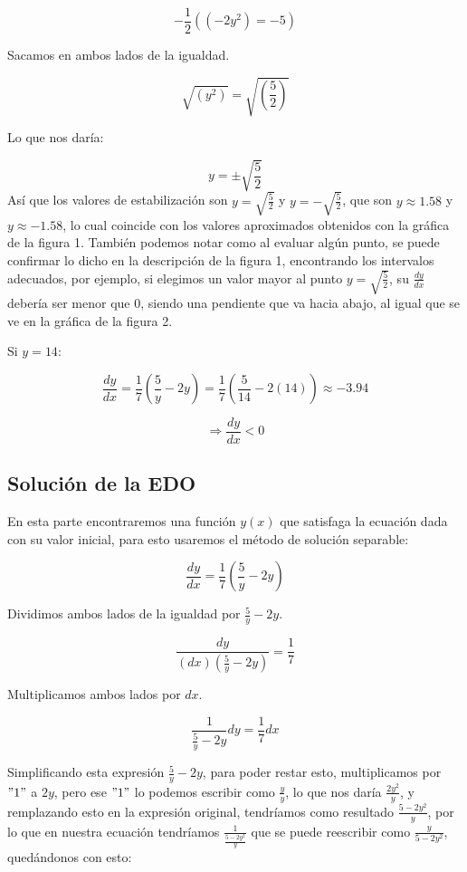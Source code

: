 \documentclass{article}
\begin{document}
\[
 -\frac{1}{2}\left((- 2y^2)  = -5\right)
\]

Sacamos en ambos lados de la igualdad.

\[
 \sqrt{(y^2)}=\sqrt{(\frac{5}{2})}
\]

Lo que nos daría:

\[
 y=\pm\sqrt{\frac{5}{2}}
\]
Así que los valores de estabilización son \(y=\sqrt{\frac{5}{2}}\) y \(y=-\sqrt{\frac{5}{2}}\), que son \(y\approx1.58\) y \(y\approx-1.58\), lo cual coincide con los valores aproximados obtenidos con la gráfica de la figura 1. También podemos notar como al evaluar algún punto, se puede confirmar lo dicho en la descripción de la figura 1, encontrando los intervalos adecuados, por ejemplo, si elegimos un valor mayor al punto \(y=\sqrt{\frac{5}{2}}\), su \(\frac{dy}{dx}\) debería ser menor que 0, siendo una pendiente que va hacia abajo, al igual que se ve en la gráfica de la figura 2.

Si \(y=14\):

\[
 \frac{dy}{dx}=\frac{1}{7}\left(\frac{5}{y}-2y\right)=\frac{1}{7}\left(\frac{5}{14}-2(14)\right)\approx-3.94
\]

\[
 \Rightarrow \frac{dy}{dx}<0
\]

\subsection{Solución de la EDO}

En esta parte encontraremos una función \(y(x)\) que satisfaga la ecuación dada con su valor inicial, para esto usaremos el método de solución separable:

\[
 \frac{dy}{dx} = \frac{1}{7} \left( \frac{5}{y} - 2y \right)
\]

Dividimos ambos lados de la igualdad por \(\frac{5}{y}-2y\).

\[
 \frac{dy}{(dx)(\frac{5}{y}-2y)}=\frac{1}{7}
\]

Multiplicamos ambos lados por \(dx\).

\[
 \frac{1}{\frac{5}{y}-2y}dy=\frac{1}{7}dx
\]

Simplificando esta expresión \(\frac{5}{y}-2y\), para poder restar esto, multiplicamos por \("1"\) a \(2y\), pero ese \("1"\) lo podemos escribir como \(\frac{y}{y}\), lo que nos daría \(\frac{2y^2}{y}\), y remplazando esto en la expresión original, tendríamos como resultado \(\frac{5-2y^2}{y}\), por lo que en nuestra ecuación tendríamos \(\frac{1}{\frac{5-2y^2}{y}}\) que se puede reescribir como \(\frac{y}{5-2y^2}\), quedándonos con esto:
\end{document}
